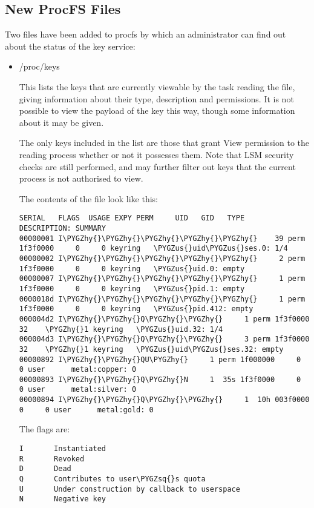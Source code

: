 \documentclass[a4paper,8pt,english]{sphinxmanual}
\def\PYGZus{\char`\_}
\def\PYGZhy{\char`\-}
\def\PYGZsq{\char`\'}
\renewcommand\PYGZsq{\textquotesingle}
\begin{document}
\subsection{New ProcFS Files}
\label{security/keys/core:new-procfs-files}
Two files have been added to procfs by which an administrator can find out
about the status of the key service:
\begin{itemize}
\item {} 
/proc/keys

This lists the keys that are currently viewable by the task reading the
file, giving information about their type, description and permissions.
It is not possible to view the payload of the key this way, though some
information about it may be given.

The only keys included in the list are those that grant View permission to
the reading process whether or not it possesses them.  Note that LSM
security checks are still performed, and may further filter out keys that
the current process is not authorised to view.

The contents of the file look like this:

\begin{Verbatim}[commandchars=\\\{\}]
SERIAL   FLAGS  USAGE EXPY PERM     UID   GID   TYPE      DESCRIPTION: SUMMARY
00000001 I\PYGZhy{}\PYGZhy{}\PYGZhy{}\PYGZhy{}\PYGZhy{}    39 perm 1f3f0000     0     0 keyring   \PYGZus{}uid\PYGZus{}ses.0: 1/4
00000002 I\PYGZhy{}\PYGZhy{}\PYGZhy{}\PYGZhy{}\PYGZhy{}     2 perm 1f3f0000     0     0 keyring   \PYGZus{}uid.0: empty
00000007 I\PYGZhy{}\PYGZhy{}\PYGZhy{}\PYGZhy{}\PYGZhy{}     1 perm 1f3f0000     0     0 keyring   \PYGZus{}pid.1: empty
0000018d I\PYGZhy{}\PYGZhy{}\PYGZhy{}\PYGZhy{}\PYGZhy{}     1 perm 1f3f0000     0     0 keyring   \PYGZus{}pid.412: empty
000004d2 I\PYGZhy{}\PYGZhy{}Q\PYGZhy{}\PYGZhy{}     1 perm 1f3f0000    32    \PYGZhy{}1 keyring   \PYGZus{}uid.32: 1/4
000004d3 I\PYGZhy{}\PYGZhy{}Q\PYGZhy{}\PYGZhy{}     3 perm 1f3f0000    32    \PYGZhy{}1 keyring   \PYGZus{}uid\PYGZus{}ses.32: empty
00000892 I\PYGZhy{}\PYGZhy{}QU\PYGZhy{}     1 perm 1f000000     0     0 user      metal:copper: 0
00000893 I\PYGZhy{}\PYGZhy{}Q\PYGZhy{}N     1  35s 1f3f0000     0     0 user      metal:silver: 0
00000894 I\PYGZhy{}\PYGZhy{}Q\PYGZhy{}\PYGZhy{}     1  10h 003f0000     0     0 user      metal:gold: 0
\end{Verbatim}

The flags are:

\begin{Verbatim}[commandchars=\\\{\}]
I       Instantiated
R       Revoked
D       Dead
Q       Contributes to user\PYGZsq{}s quota
U       Under construction by callback to userspace
N       Negative key
\end{Verbatim}


\end{itemize}
\end{document}
